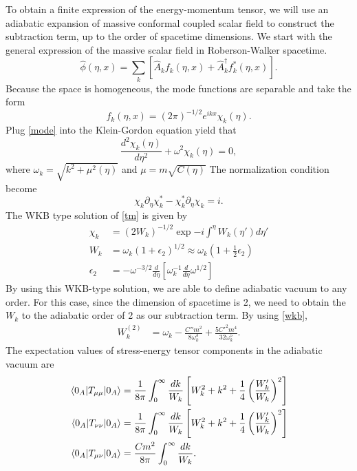 \documentclass[12pt]{article}
\numberwithin{equation}{section}
\theoremstyle{1style}
\begin{document}
To obtain a finite expression of the energy-momentum tensor, we will use an adiabatic expansion of massive conformal coupled 
scalar field to construct the subtraction term, up to the order of spacetime dimensions.
We start with the general expression of the massive scalar field in Roberson-Walker spacetime.
\begin{equation}
  \hat{\phi}(\eta,x)=\sum_{k}\left[\hat{A}_{k}f_{k}(\eta,x)+\hat{A}^\dagger_{k}f^*_{k}(\eta,x)\right].
\end{equation}
Because the space is homogeneous, the mode functions are separable and take the form
\begin{equation}\label{mode}
  f_{k}(\eta,x)=(2\pi)^{-1/2}e^{ikx}\chi_{k}(\eta).
\end{equation}
Plug \ref{mode} into the Klein-Gordon equation
yield that 
\begin{equation}\label{tm}
  \frac{d^2\chi_{k}(\eta)}{d\eta^2} + \omega^2\chi_{k}(\eta)=0,
\end{equation}
where \(\omega_{k}=\sqrt{k^2+\mu^2(\eta)}\) and \(\mu=m\sqrt{C(\eta)}\)
The normalization condition become 
\begin{equation}
  \chi_{k}\partial_{\eta}\chi_{k}^*-\chi_{k}^*\partial_{\eta}\chi_{k}=i.
\end{equation}
The WKB type solution of \ref{tm} is given by 
\begin{align}\label{wkb}
  \chi_k&=(2W_{k})^{-1/2}\exp{-i\int^{\eta}W_k(\eta')d\eta'}\\
  W_k&=\omega_k(1+\epsilon_2)^{1/2}\approx\omega_k(1+\frac{1}{2}\epsilon_2)\\
  \epsilon_2&=-\omega^{-3/2}\frac{d}{d\eta}\left[ \omega^{-1}_{k}\frac{d}{d\eta}\omega^{1/2} \right]
\end{align}
By using this WKB-type solution, we are able to define adiabatic vacuum to any order. 
For this case, since the dimension of spacetime is 2, we need to obtain the \(W_{k}\) to the adiabatic order of 2 as our subtraction term.
By using \ref{wkb}, 
\begin{align}\label{A2}
  W_k^{(2)}&=\omega_{k}-\frac{C''m^2}{8\omega^3_k}+\frac{5C'^2m^4}{32\omega^5_k}.
\end{align}
The expectation values of stress-energy tensor components in the adiabatic vacuum are 
\begin{align}
  \expval{T_{\mu\mu}}{0_A}&=\frac{1}{8\pi}\int_{0}^{\infty} \frac{dk}{W_k}\left[W_k^2+k^2+\frac{1}{4}\left(\frac{W'_{k}}{W_k}\right)^2\right]\\
  \expval{T_{\nu\nu}}{0_A}&=\frac{1}{8\pi}\int_{0}^{\infty} \frac{dk}{W_k}\left[W_k^2+k^2+\frac{1}{4}\left(\frac{W'_{k}}{W_k}\right)^2\right]\\
  \expval{T_{\mu\nu}}{0_A}&=\frac{Cm^2}{8\pi}\int_{0}^{\infty}\frac{dk}{W_k}.
\end{align}
\end{document}
